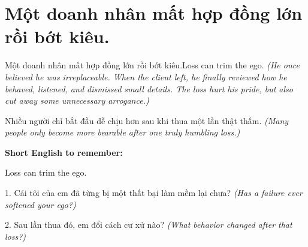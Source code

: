 \section{Một doanh nhân mất hợp đồng lớn rồi bớt kiêu.}
\begin{truyen}{Một doanh nhân mất hợp đồng lớn rồi bớt kiêu.}{Loss can trim the ego.}
\textit{(He once believed he was irreplaceable. When the client left, he finally reviewed how he behaved, listened, and dismissed small details. The loss hurt his pride, but also cut away some unnecessary arrogance.)}
\end{truyen}
\begin{baihoc}
Nhiều người chỉ bắt đầu dễ chịu hơn sau khi thua một lần thật thấm.
\textit{(Many people only become more bearable after one truly humbling loss.)}
\end{baihoc}
\begin{ghinhoanh}\textbf{Short English to remember:}

Loss can trim the ego.
\end{ghinhoanh}
\begin{tuhocnhanh}
1. Cái tôi của em đã từng bị một thất bại làm mềm lại chưa? \textit{(Has a failure ever softened your ego?)}

2. Sau lần thua đó, em đổi cách cư xử nào? \textit{(What behavior changed after that loss?)}
\end{tuhocnhanh}
\ngancach

